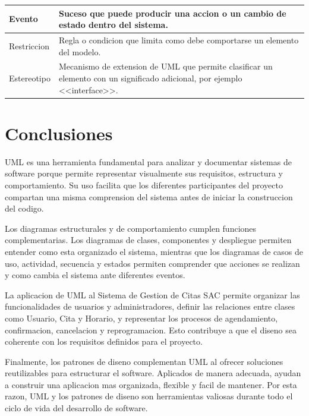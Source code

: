 \documentclass[12pt,letterpaper]{article}
\begin{document}
\begin{longtable}{|p{3.8cm}|p{11.1cm}|}
Evento & Suceso que puede producir una accion o un cambio de estado dentro del sistema. \\
\hline

Restriccion & Regla o condicion que limita como debe comportarse un elemento del modelo. \\
\hline

Estereotipo & Mecanismo de extension de UML que permite clasificar un elemento con un significado adicional, por ejemplo <<interface>>. \\
\hline
\end{longtable}

\section{Conclusiones}

UML es una herramienta fundamental para analizar y documentar sistemas de software porque permite representar visualmente sus requisitos, estructura y comportamiento. Su uso facilita que los diferentes participantes del proyecto compartan una misma comprension del sistema antes de iniciar la construccion del codigo.

Los diagramas estructurales y de comportamiento cumplen funciones complementarias. Los diagramas de clases, componentes y despliegue permiten entender como esta organizado el sistema, mientras que los diagramas de casos de uso, actividad, secuencia y estados permiten comprender que acciones se realizan y como cambia el sistema ante diferentes eventos.

La aplicacion de UML al Sistema de Gestion de Citas SAC permite organizar las funcionalidades de usuarios y administradores, definir las relaciones entre clases como Usuario, Cita y Horario, y representar los procesos de agendamiento, confirmacion, cancelacion y reprogramacion. Esto contribuye a que el diseno sea coherente con los requisitos definidos para el proyecto.

Finalmente, los patrones de diseno complementan UML al ofrecer soluciones reutilizables para estructurar el software. Aplicados de manera adecuada, ayudan a construir una aplicacion mas organizada, flexible y facil de mantener. Por esta razon, UML y los patrones de diseno son herramientas valiosas durante todo el ciclo de vida del desarrollo de software.
\end{document}

